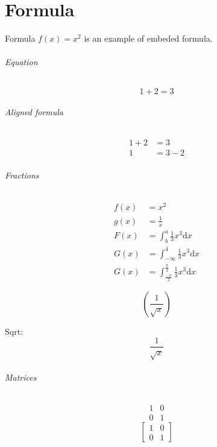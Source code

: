 \chapter{Formula}
Formula $f(x) = x^2$ is an example of embeded formula.

\subparagraph{Equation}

\begin{equation*}
  1 + 2 = 3
\end{equation*}

\subparagraph{Aligned formula}
\begin{align*}
  1 + 2 &= 3\\
  1 &= 3 - 2
\end{align*}

\subparagraph{Fractions}
\begin{align*}
  f(x) &= x^2\\
  g(x) &= \frac{1}{x}\\
  F(x) &= \int^a_b \frac{1}{3}x^3 \mathrm{d}x\\
  G(x) &= \int^4_{-\infty} \frac{1}{3}x^3 \mathrm{d}x\\
  G(x) &= \int^{\frac{\pi}{2}}_{\frac{-\pi}{2}} \frac{1}{3}x^3 \mathrm{d}x
\end{align*}

\begin{equation*}
  \left(
    \frac{1}{\sqrt{x}}
  \right)
\end{equation*}

Sqrt:
\begin{equation*}
  \frac{1}{\sqrt{x}}
\end{equation*}

\subparagraph{Matrices}
\begin{equation*}
  \begin{matrix}
  1 & 0\\
  0 & 1
  \end{matrix}
\end{equation*}
\begin{equation*}
\left[
  \begin{matrix}
  1 & 0\\
  0 & 1
  \end{matrix}
\right]
\end{equation*}